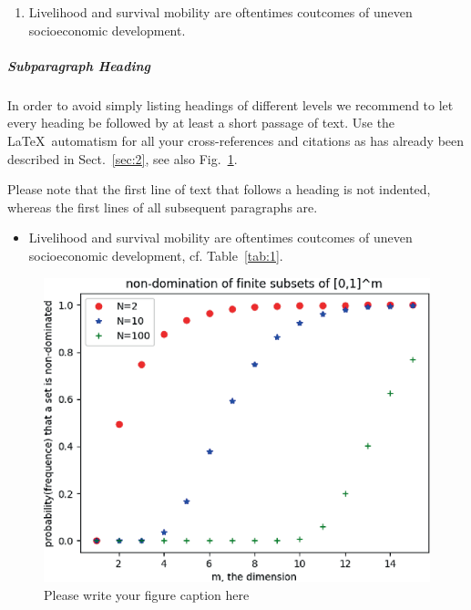 \begin{enumerate}
	\item{Livelihood and survival mobility are oftentimes coutcomes of uneven socioeconomic development.}
\end{enumerate}


\subparagraph{Subparagraph Heading} In order to avoid simply listing headings of different levels we recommend to let every heading be followed by at least a short passage of text. Use the \LaTeX\ automatism for all your cross-references and citations as has already been described in Sect.~\ref{sec:2}, see also Fig.~\ref{fig:2}.

Please note that the first line of text that follows a heading is not indented, whereas the first lines of all subsequent paragraphs are.

\begin{itemize}
	\item{Livelihood and survival mobility are oftentimes coutcomes of uneven socioeconomic development, cf. Table~\ref{tab:1}.}
\end{itemize}

\begin{figure}[t]
	\sidecaption[t]
	\includegraphics{figure}
	\caption{Please write your figure caption here}
	\label{fig:2}       %
\end{figure}

